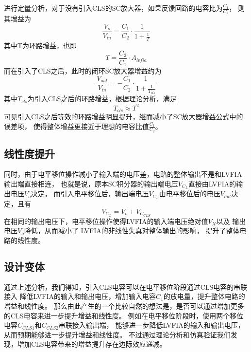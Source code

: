 进行定量分析，对于没有引入CLS的SC放大器，如果反馈回路的电容比为${\frac{C_1}{C_2} }$，
则其增益为
\begin{equation}
    \frac{V_o}{V_{in}} = \frac{C_1}{C_2}\cdot\frac{1}{1+\frac{1}{T} }
\end{equation}
其中T为环路增益，也即
\begin{equation}
    T = \frac{C_2}{C_1}\cdot A_{lvfia}
\end{equation}
而在引入了CLS之后，此时的闭环SC放大器增益约为
\begin{equation}
    \frac{V_{out}}{V_{in}}
    =-\frac{C_1}{C_2}\cdot
    \frac{1}{1+\frac{1}{T_{cls}} }
\end{equation}
其中$T_{cls}$为引入CLS之后的环路增益，根据理论分析，满足
\begin{equation}
    T_{cls} \approx T^2
\end{equation}
可见引入CLS之后等效的环路增益明显提升，继而减小了SC放大器增益公式中的误差项，
使得整体增益更接近于理想的电容比值$\frac{C_1}{C_2}$。

\subsection{线性度提升}
同时，由于电平移位操作减小了输入端的电压差，电路的整体输出不是和LVFIA输出端直接相连，
也就是说，原本SC积分器的输出端电压${V_{C_L}}$直接由LVFIA的输出电压${V_o}$决定，
而引入电平移位后，输出端电压${V_{C_L}}$由电平移位后的电压${V_{out}}$决定，且有
\begin{equation}
    {V_{C_L}} = {V_o} + {V_{C_{CLS}}}
\end{equation}
在相同的输出电压下，电平移位操作使得LVFIA的输入端电压绝对值${V_X}$以及
输出电压${V_o}$降低，从而减小了
LVFIA的非线性失真对整体输出的影响，
提升了整体电路的线性度。

\subsection{设计变体}
通过上述分析，我们得知，引入CLS电容可以在电平移位阶段通过CLS电容的串联接入
降低LVFIA的输入和输出电压，增加输入电容${C_1}$的放电量，提升整体电路的增益和线性度。
那么由此产生的一个比较自然的想法是，是否可以通过增加更多的CLS电容来进一步提升增益和线性度。
例如在电平移位阶段时，使用两个移位电容${C_{CLS1}}$和${C_{CLS2}}$串联接入输出端，
能够进一步降低LVFIA的输入和输出电压，从而预期能够进一步提升增益和线性度。
不过通过理论分析和仿真验证我们发现，增加CLS电容带来的增益提升存在边际效应递减。





